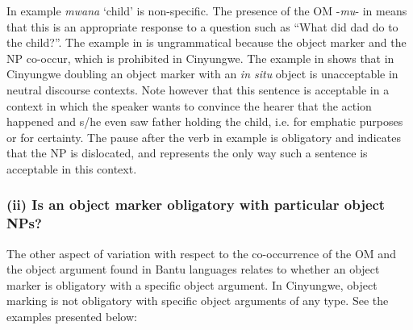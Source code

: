 \documentclass[output=paper]{langscibook}
\begin{document}


    \z
\z

In example  \textit{mwana} ‘child’ is non-specific. The presence of the OM -\textit{mu}{}- in  means that this is an appropriate response to a question such as “What did dad do to the child?”. The example in  is ungrammatical because the object marker and the NP co-occur, which is prohibited in Cinyungwe. The example in  shows that in Cinyungwe doubling an object marker with an \textit{in situ} object is unacceptable in neutral discourse contexts. Note however that this sentence is acceptable in a context in which the speaker wants to convince the hearer that the action happened and s/he even saw father holding the child, i.e. for emphatic purposes or for certainty. The pause after the verb in example  is obligatory and indicates that the NP is dislocated, and represents the only way such a sentence is acceptable in this context. 

\subsubsection{(ii) Is an object marker obligatory with particular object NPs?}

The other aspect of variation with respect to the co-occurrence of the OM and the object argument found in Bantu languages relates to whether an object marker is obligatory with a specific object argument. In Cinyungwe, object marking is not obligatory with specific object arguments of any type. See the examples presented below:
\end{document}
